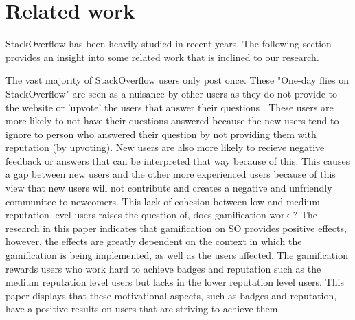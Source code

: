 \documentclass{sigchi}
\begin{document}
\section{Related work}
StackOverflow has been heavily studied in recent years. The following section provides an insight into some related work that is inclined to our research.

The vast majority of StackOverflow users only post once. These "One-day flies on StackOverflow" are seen as a nuisance by other users as they do not provide to the website or 'upvote' the users that answer their questions \cite{Slag}. These users are more likely to not have their questions answered because the new users tend to ignore to person who answered their question by not providing them with reputation (by upvoting). New users are also more likely to recieve negative feedback or answers that can be interpreted that way because of this. This causes a gap between new users and the other more experienced users because of this view that new users will not contribute and creates a negative and unfriendly communitee to newcomers. This lack of cohesion between low and medium reputation level users raises the question of, does gamification work \cite{Hamari}? The research in this paper indicates that gamification on SO provides positive effects, however, the effects are greatly dependent on the context in which the gamification is being implemented, as well as the users affected. The gamification rewards users who work hard to achieve badges and reputation such as the medium reputation level users but lacks in the lower reputation level users. This paper displays that these motivational aspects, such as badges and reputation, have a positive results on users that are striving to achieve them.
\end{document}
